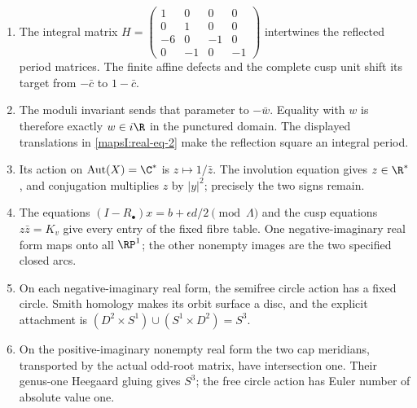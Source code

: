 \RungOne
\begin{enumerate}[label=\arabic*.]
\item The integral matrix
$H=\left(\begin{smallmatrix}1&0&0&0\\0&1&0&0\\-6&0&-1&0\\0&-1&0&-1\end{smallmatrix}\right)$
intertwines the reflected period matrices. The finite affine defects
and the complete cusp unit shift its target from $-\bar c$ to
$1-\bar c$.
\item The moduli invariant sends that parameter to $-\bar w$.
Equality with $w$ is therefore exactly $w\in i\R$ in the punctured
domain. The displayed translations in \ref{mapsI:real-eq-2} make
the reflection square an integral period.
\item Its action on $\operatorname{Aut}(X)=\C^*$ is
$z\mapsto1/\bar z$. The involution equation gives $z\in\R^*$,
and conjugation multiplies $z$ by $|y|^2$; precisely the two signs
remain.
\item The equations $(I-R_\bullet)x=b+\epsilon d/2\pmod\Lambda$
and the cusp equations $z\bar z=K_v$ give every entry of the fixed
fibre table. One negative-imaginary real form maps onto all
$\RP^1$; the other nonempty images are the two specified closed arcs.
\item On each negative-imaginary real form, the semifree circle
action has a fixed circle. Smith homology makes its orbit surface
a disc, and the explicit attachment is
$(D^2\times S^1)\cup(S^1\times D^2)=S^3$.
\item On the positive-imaginary nonempty real form the two cap
meridians, transported by the actual odd-root matrix, have
intersection one. Their genus-one Heegaard gluing gives $S^3$;
the free circle action has Euler number of absolute value one.
\end{enumerate}

